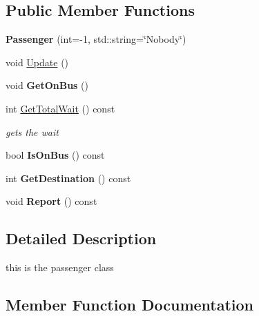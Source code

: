 \subsection*{Public Member Functions}
\begin{DoxyCompactItemize}
\item 
\mbox{\label{classPassenger_a5c3addb9a6fd03e5e5642ed844e2702c}} 
{\bfseries Passenger} (int=-\/1, std\+::string=\char`\"{}Nobody\char`\"{})
\item 
void \hyperlink{classPassenger_a960de3b29fc17a2c2d79c0b79d5cf299}{Update} ()
\item 
\mbox{\label{classPassenger_ae2ba639cfef39781ac079778578bd9fe}} 
void {\bfseries Get\+On\+Bus} ()
\item 
int \hyperlink{classPassenger_a25158560f790ef7ef06d94c414b34f25}{Get\+Total\+Wait} () const
\begin{DoxyCompactList}\small\item\em gets the wait \end{DoxyCompactList}\item 
\mbox{\label{classPassenger_a2acf008ec444afcc859b914ee24add0e}} 
bool {\bfseries Is\+On\+Bus} () const
\item 
\mbox{\label{classPassenger_a49db0ee527377aae6077df190a11501c}} 
int {\bfseries Get\+Destination} () const
\item 
\mbox{\label{classPassenger_ac54ce797e412a4895febe10f07dc5df5}} 
void {\bfseries Report} () const
\end{DoxyCompactItemize}


\subsection{Detailed Description}
this is the passenger class 

\subsection{Member Function Documentation}
\mbox{\label{classPassenger_a25158560f790ef7ef06d94c414b34f25}} 
